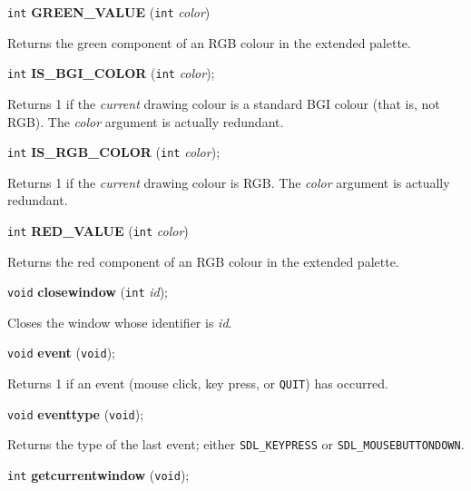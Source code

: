 \documentclass[a4paper,11pt]{article}
\newcommand{\V}{\texttt{void}}      %
\newcommand{\I}{\texttt{int}}       %
\newcommand{\func}[1]{\textbf{#1}}  %
\newcommand{\A}[1]{\emph{#1}}       %
\newcommand{\T}[1]{\texttt{#1}}     %
\newenvironment{bgi}
{ %
  \begin{snugshade}
}
{ %
  \end{snugshade}
}
\begin{document}
\begin{bgi}
\I{} \func{GREEN\_VALUE} (\I{} \A{color})
\end{bgi}

Returns the green component of an RGB colour in the extended palette.


\begin{bgi}
\I{} \func{IS\_BGI\_COLOR} (\I{} \A{color});
\end{bgi}

Returns 1 if the \emph{current} drawing colour is a standard BGI
colour (that is, not RGB). The \A{color} argument is actually
redundant.


\begin{bgi}
\I{} \func{IS\_RGB\_COLOR} (\I{} \A{color});
\end{bgi}

Returns 1 if the \emph{current} drawing colour is RGB. The \A{color}
argument is actually redundant.


\begin{bgi}
\I{} \func{RED\_VALUE} (\I{} \A{color})
\end{bgi}

Returns the red component of an RGB colour in the extended palette.


\begin{bgi}
\V{} \func{closewindow} (\I{} \A{id});
\end{bgi}

Closes the window whose identifier is \A{id}.


\begin{bgi}
\V{} \func{event} (\V{});
\end{bgi}

Returns 1 if an event (mouse click, key press, or \T{QUIT}) has occurred.


\begin{bgi}
\V{} \func{eventtype} (\V{});
\end{bgi}

Returns the type of the last event; either \T{SDL\_KEYPRESS} or
\T{SDL\_MOUSEBUTTONDOWN}.


\begin{bgi}
\I{} \func{getcurrentwindow} (\V{});
\end{bgi}
\end{document}
